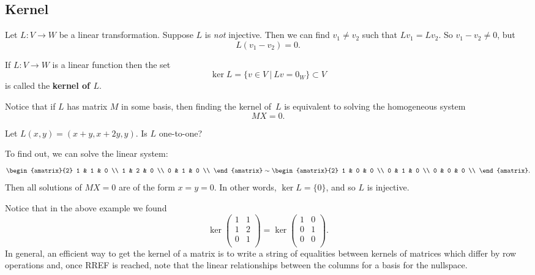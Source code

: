 \subsection{Kernel}
Let \(L \colon V \to W\) be a linear transformation. Suppose \(L\) is \emph{not} injective.  Then we can find $v_1 \neq v_2$ such that $Lv_1=Lv_2$.  So $v_1-v_2\neq 0$, but
\[
L(v_1-v_2)=0.
\]

\begin{definition}
If $L \colon V\rightarrow W$ is a linear function  then the set 
\[
\ker L = \{v\in V ~|~ Lv=0_W \}\subset V 
\]
is called the {\bfseries kernel of $L$}.
\end{definition}


Notice that if $L$ has matrix $M$ in some basis, then finding the kernel of~$L$ is equivalent to solving the homogeneous system 
\[
MX=0.
\]

\begin{example}
Let $L(x,y)=(x+y,x+2y,y)$.  Is $L$ one-to-one?

To find out, we can solve the linear system:
\[
\begin{amatrix}{2}
1 & 1 & 0 \\
1 & 2 & 0 \\
0 & 1 & 0 \\
\end{amatrix} \sim
\begin{amatrix}{2}
1 & 0 & 0 \\
0 & 1 & 0 \\
0 & 0 & 0 \\
\end{amatrix}.
\]
Then all solutions of $MX=0$ are of the form $x=y=0$.  In other words, $\ker L=\{0\}$, and so $L$ is injective.
\end{example}


Notice that in the above example we found 
\[\ker 
\begin{pmatrix}
1 & 1  \\
1 & 2  \\
0 & 1 \\
\end{pmatrix} =
\ker
\begin{pmatrix}
1 & 0 \\
0 & 1  \\
0 & 0  \\
\end{pmatrix}.
\]
In general, an efficient way to get the  kernel of a matrix is to write a string of equalities between kernels of matrices which differ by row operations and, once RREF is reached, note that the linear relationships between the columns for a basis for the nullspace.


